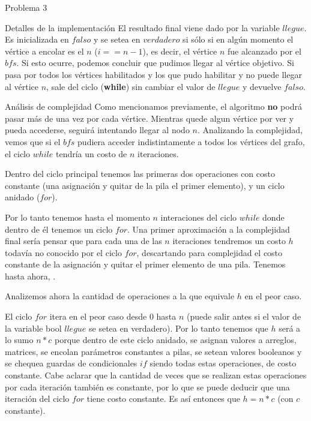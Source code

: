 \begin{section}{Problema 3}
\begin{subsection}{Detalles de la implementación}
		El resultado final viene dado por la variable $llegue$. Es inicializada en $falso$ y se setea en $verdadero$ si sólo si en algún momento el vértice a encolar es el $n$ ($i == n-1$), es decir, el vértice $n$ fue alcanzado por el $bfs$. Si esto ocurre, podemos concluir que pudimos llegar al vértice objetivo. Si pasa por todos los vértices habilitados y los que pudo habilitar y no puede llegar al vértice $n$, sale del ciclo (\textbf{while}) sin cambiar el valor de $llegue$ y devuelve $falso$.
		
	\end{subsection}


	\begin{subsection}{Análisis de complejidad}
		Como mencionamos previamente, el algoritmo \textbf{no} podrá pasar más de una vez por cada vértice. Mientras quede algun vértice por ver y pueda accederse, seguirá intentando llegar al nodo $n$. Analizando la complejidad, vemos que si el $bfs$ pudiera acceder indistintamente a todos los vértices del grafo, el ciclo $while$ tendría un costo de $n$ iteraciones.
		
		Dentro del ciclo principal tenemos las primeras dos operaciones con costo constante (una asignación y quitar de la pila el primer elemento), y un ciclo anidado ($for$).
		
		Por lo tanto tenemos hasta el momento $n$ interaciones del ciclo $while$ donde dentro de él tenemos un ciclo $for$. Una primer aproximación a la complejidad final sería pensar que para cada una de las $n$ iteraciones tendremos un costo $h$ todavía no conocido por el ciclo $for$, descartando para complejidad el costo constante de la asignación y quitar el primer elemento de una pila. Tenemos hasta ahora, .
		
		Analizemos ahora la cantidad de operaciones a la que equivale $h$ en el peor caso.
		
		El ciclo $for$ itera en el peor caso desde $0$ hasta $n$ (puede salir antes si el valor de la variable bool $llegue$ se setea en verdadero). Por lo tanto tenemos que $h$ será a lo sumo $n*c$ porque dentro de este ciclo anidado, se asignan valores a arreglos, matrices, se encolan parámetros constantes a pilas, se setean valores booleanos y se chequea guardas de condicionales $if$ siendo todas estas operaciones, de costo constante. Cabe aclarar que la cantidad de veces que se realizan estas operaciones por cada iteración también es constante, por lo que se puede deducir que una iteración del ciclo $for$ tiene costo constante. Es así entonces que $h = n*c$ (con $c$ constante).
		

\end{subsection}
\end{section}
